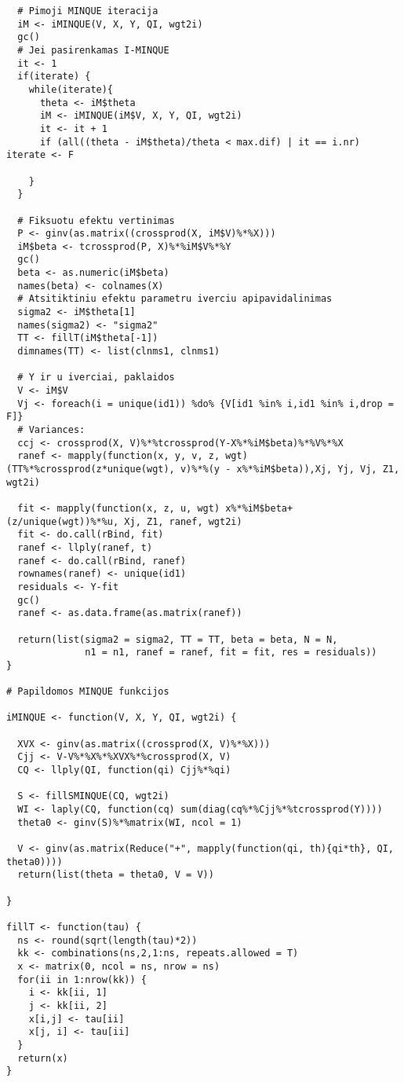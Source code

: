 \documentclass[12pt,a4paper]{article}
\begin{document}
\begin{appendix}
\begin{footnotesize}
\begin{verbatim}
  # Pimoji MINQUE iteracija
  iM <- iMINQUE(V, X, Y, QI, wgt2i)
  gc()
  # Jei pasirenkamas I-MINQUE
  it <- 1
  if(iterate) {
    while(iterate){
      theta <- iM$theta
      iM <- iMINQUE(iM$V, X, Y, QI, wgt2i)
      it <- it + 1
      if (all((theta - iM$theta)/theta < max.dif) | it == i.nr) iterate <- F

    }
  }
  
  # Fiksuotu efektu vertinimas
  P <- ginv(as.matrix((crossprod(X, iM$V)%*%X)))
  iM$beta <- tcrossprod(P, X)%*%iM$V%*%Y
  gc()
  beta <- as.numeric(iM$beta)
  names(beta) <- colnames(X)
  # Atsitiktiniu efektu parametru iverciu apipavidalinimas
  sigma2 <- iM$theta[1]
  names(sigma2) <- "sigma2"
  TT <- fillT(iM$theta[-1])
  dimnames(TT) <- list(clnms1, clnms1)
  
  # Y ir u iverciai, paklaidos
  V <- iM$V
  Vj <- foreach(i = unique(id1)) %do% {V[id1 %in% i,id1 %in% i,drop = F]}
  # Variances:
  ccj <- crossprod(X, V)%*%tcrossprod(Y-X%*%iM$beta)%*%V%*%X
  ranef <- mapply(function(x, y, v, z, wgt) (TT%*%crossprod(z*unique(wgt), v)%*%(y - x%*%iM$beta)),Xj, Yj, Vj, Z1, wgt2i)
  
  fit <- mapply(function(x, z, u, wgt) x%*%iM$beta+(z/unique(wgt))%*%u, Xj, Z1, ranef, wgt2i)
  fit <- do.call(rBind, fit)
  ranef <- llply(ranef, t)
  ranef <- do.call(rBind, ranef)
  rownames(ranef) <- unique(id1)
  residuals <- Y-fit
  gc()
  ranef <- as.data.frame(as.matrix(ranef))

  return(list(sigma2 = sigma2, TT = TT, beta = beta, N = N, 
              n1 = n1, ranef = ranef, fit = fit, res = residuals))
}

# Papildomos MINQUE funkcijos

iMINQUE <- function(V, X, Y, QI, wgt2i) {
  
  XVX <- ginv(as.matrix((crossprod(X, V)%*%X)))
  Cjj <- V-V%*%X%*%XVX%*%crossprod(X, V)
  CQ <- llply(QI, function(qi) Cjj%*%qi)
  
  S <- fillSMINQUE(CQ, wgt2i)
  WI <- laply(CQ, function(cq) sum(diag(cq%*%Cjj%*%tcrossprod(Y))))
  theta0 <- ginv(S)%*%matrix(WI, ncol = 1)
  
  V <- ginv(as.matrix(Reduce("+", mapply(function(qi, th){qi*th}, QI, theta0))))
  return(list(theta = theta0, V = V))
  
}

fillT <- function(tau) {
  ns <- round(sqrt(length(tau)*2))
  kk <- combinations(ns,2,1:ns, repeats.allowed = T)
  x <- matrix(0, ncol = ns, nrow = ns)
  for(ii in 1:nrow(kk)) {
    i <- kk[ii, 1]
    j <- kk[ii, 2]
    x[i,j] <- tau[ii]
    x[j, i] <- tau[ii]
  }
  return(x)
}


\end{verbatim}
\end{footnotesize}
\end{appendix}
\end{document}
